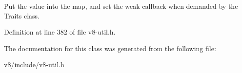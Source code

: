 Put the value into the map, and set the \textquotesingle{}weak\textquotesingle{} callback when demanded by the Traits class. 

Definition at line 382 of file v8-\/util.\+h.



The documentation for this class was generated from the following file\+:\begin{DoxyCompactItemize}
\item 
v8/include/v8-\/util.\+h\end{DoxyCompactItemize}
